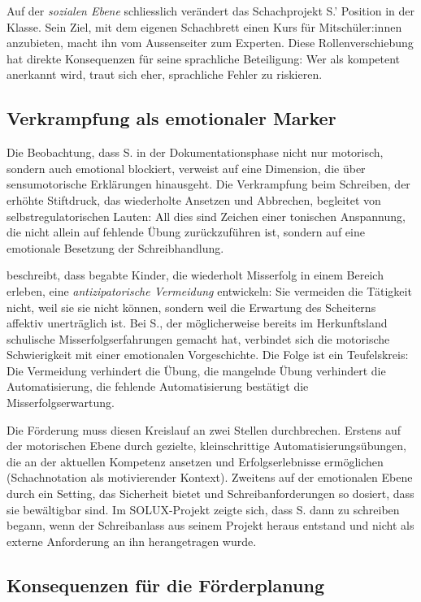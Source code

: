 \documentclass[ngerman, a4paper]{article}
\begin{document}
Auf der \textit{sozialen Ebene} schliesslich verändert das Schachprojekt S.' Position
in der Klasse. Sein Ziel, mit dem eigenen Schachbrett einen Kurs für Mitschüler:innen
anzubieten, macht ihn vom Aussenseiter zum Experten. Diese Rollenverschiebung hat
direkte Konsequenzen für seine sprachliche Beteiligung: Wer als kompetent anerkannt
wird, traut sich eher, sprachliche Fehler zu riskieren.

\subsection{Verkrampfung als emotionaler Marker}

Die Beobachtung, dass S. in der Dokumentationsphase nicht nur motorisch, sondern
auch emotional blockiert, verweist auf eine Dimension, die über sensumotorische
Erklärungen hinausgeht. Die Verkrampfung beim Schreiben, der erhöhte Stiftdruck,
das wiederholte Ansetzen und Abbrechen, begleitet von selbstregulatorischen Lauten:
All dies sind Zeichen einer tonischen Anspannung, die nicht allein auf fehlende
Übung zurückzuführen ist, sondern auf eine emotionale Besetzung der Schreibhandlung.

\textcite{lehwald2017motivation} beschreibt, dass begabte Kinder, die wiederholt Misserfolg in einem Bereich
erleben, eine \textit{antizipatorische Vermeidung} entwickeln: Sie vermeiden die Tätigkeit
nicht, weil sie sie nicht können, sondern weil die Erwartung des Scheiterns affektiv
unerträglich ist. Bei S., der möglicherweise bereits im Herkunftsland schulische
Misserfolgserfahrungen gemacht hat, verbindet sich die motorische Schwierigkeit mit
einer emotionalen Vorgeschichte. Die Folge ist ein Teufelskreis: Die Vermeidung
verhindert die Übung, die mangelnde Übung verhindert die Automatisierung, die
fehlende Automatisierung bestätigt die Misserfolgserwartung.

Die Förderung muss diesen Kreislauf an zwei Stellen durchbrechen. Erstens auf der
motorischen Ebene durch gezielte, kleinschrittige Automatisierungsübungen, die an
der aktuellen Kompetenz ansetzen und Erfolgserlebnisse ermöglichen (Schachnotation
als motivierender Kontext). Zweitens auf der emotionalen Ebene durch ein Setting, das
Sicherheit bietet und Schreibanforderungen so dosiert, dass sie bewältigbar sind. Im
SOLUX-Projekt zeigte sich, dass S. dann zu schreiben begann, wenn der Schreibanlass
aus seinem Projekt heraus entstand und nicht als externe Anforderung an ihn
herangetragen wurde.

\subsection{Konsequenzen für die Förderplanung}
\end{document}
